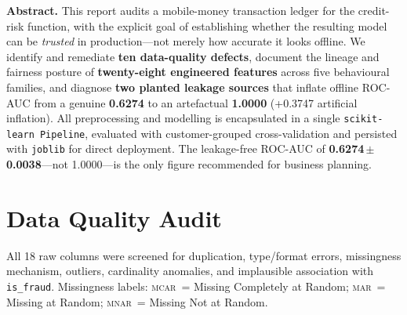 \documentclass[10pt,a4paper]{article}
\newcommand{\mcar}{\textsc{mcar}}
\newcommand{\mar}{\textsc{mar}}
\newcommand{\mnar}{\textsc{mnar}}
\begin{document}
\begin{mdframed}[linewidth=0.5pt,innerleftmargin=6pt,
  innerrightmargin=6pt,innertopmargin=4pt,innerbottommargin=4pt,
  skipabove=3pt,skipbelow=4pt]
\fontsize{8}{9.5}\selectfont
\textbf{Abstract.}\enspace
This report audits a mobile-money transaction ledger for the credit-risk
function, with the explicit goal of establishing whether the resulting model
can be \emph{trusted} in production---not merely how accurate it looks offline.
We identify and remediate \textbf{ten data-quality defects}, document the
lineage and fairness posture of \textbf{twenty-eight engineered features}
across five behavioural families, and diagnose \textbf{two planted leakage
sources} that inflate offline ROC-AUC from a genuine \textbf{0.6274} to an
artefactual \textbf{1.0000} (+0.3747 artificial inflation). All preprocessing
and modelling is encapsulated in a single \texttt{scikit-learn Pipeline},
evaluated with customer-grouped cross-validation and persisted with
\texttt{joblib} for direct deployment. The leakage-free ROC-AUC of
\textbf{0.6274\,$\pm$\,0.0038}---not 1.0000---is the only figure recommended
for business planning.
\end{mdframed}

\vspace{3pt}

\section{Data Quality Audit}
\label{sec:dqa}

All 18 raw columns were screened for duplication, type/format errors,
missingness mechanism, outliers, cardinality anomalies, and implausible
association with \texttt{is\_fraud}. Missingness labels: \mcar\ = Missing
Completely at Random; \mar\ = Missing at Random; \mnar\ = Missing Not at
Random.
\end{document}
